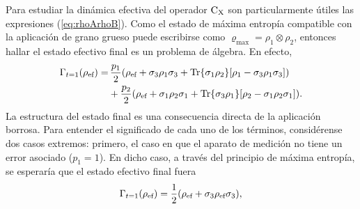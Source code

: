 Para estudiar la dinámica efectiva del operador $\text{C}_{\text{X}}$ son particularmente útiles las expresiones (\ref{eq:rhoArhoB}). Como el estado de máxima entropía compatible con la aplicación de grano grueso puede escribirse como $\varrho_{\max}=\rho_{1}\otimes\rho_{2}$, entonces hallar el estado efectivo final es un problema de álgebra. En efecto,
\begin{align}
    \Gamma_{t=1}(\rho_{\text{ef}})=&\,\frac{p_{1}}{2}(\rho_{\text{ef}}+\sigma_{3}\rho_{1}\sigma_{3}+\Tr{\sigma_{1}\rho_{2}}[\rho_{1}-\sigma_{3}\rho_{1}\sigma_{3}])\nonumber\\
    &+\frac{p_{2}}{2}(\rho_{\text{ef}}+\sigma_{1}\rho_{2}\sigma_{1}+\Tr{\sigma_{3}\rho_{1}}[\rho_{2}-\sigma_{1}\rho_{2}\sigma_{1}]).\nonumber
\end{align}
La estructura del estado final es una consecuencia directa de la aplicación borrosa. Para entender el significado de cada uno de los términos, considérense dos casos extremos: primero, el caso en que el aparato de medición no tiene un error asociado ($p_{1}=1$). En dicho caso, a través del principio de máxima entropía, se esperaría que el estado efectivo final fuera
\begin{equation}
  \Gamma_{t=1}(\rho_{\text{ef}})=\frac{1}{2}\qty(\rho_{\text{ef}}+\sigma_{3}\rho_{\text{ef}}\sigma_{3}),\nonumber
\end{equation}
